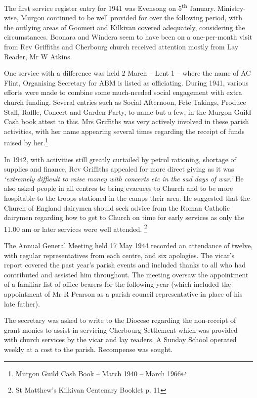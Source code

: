 The first service register entry for 1941 was Evensong on 5\textsuperscript{th} January. Ministry-wise, Murgon continued to be well provided for over the following period, with the outlying areas of Goomeri and Kilkivan covered adequately, considering the circumstances. Boonara and Windera seem to have been on a one-per-month visit from Rev Griffiths and Cherbourg church received attention mostly from Lay Reader, Mr W Atkins.

One service with a difference was held 2 March -- Lent 1 -- where the name of AC Flint, Organising Secretary for ABM is listed as officiating. During 1941, various efforts were made to combine some much-needed social engagement with extra church funding. Several entries such as Social Afternoon, Fete Takings, Produce Stall, Raffle, Concert and Garden Party, to name but a few, in the Murgon Guild Cash book attest to this. Mrs Griffiths was very actively involved in these parish activities, with her name appearing several times regarding the receipt of funds raised by her.\footnote{Murgon Guild Cash Book -- March 1940 -- March 1966}

In 1942, with activities still greatly curtailed by petrol rationing, shortage of supplies and finance, Rev Griffiths appealed for more direct giving as it was \emph{`extremely difficult to raise money with concerts etc in the sad days of war.'} He also asked people in all centres to bring evacuees to Church and to be more hospitable to the troops stationed in the camps their area. He suggested that the Church of England dairymen should seek advice from the Roman Catholic dairymen regarding how to get to Church on time for early services as only the 11.00 am or later services were well attended. \footnote{St Matthew's Kilkivan Centenary Booklet p. 11}

The Annual General Meeting held 17 May 1944 recorded an attendance of twelve, with regular representatives from each centre, and six apologies. The vicar's report covered the past year's parish events and included thanks to all who had contributed and assisted him throughout. The meeting oversaw the appointment of a familiar list of office bearers for the following year (which included the appointment of Mr R Pearson as a parish council representative in place of his late father).

The secretary was asked to write to the Diocese regarding the non-receipt of grant monies to assist in servicing Cherbourg Settlement which was provided with church services by the vicar and lay readers. A Sunday School operated weekly at a cost to the parish. Recompense was sought.

